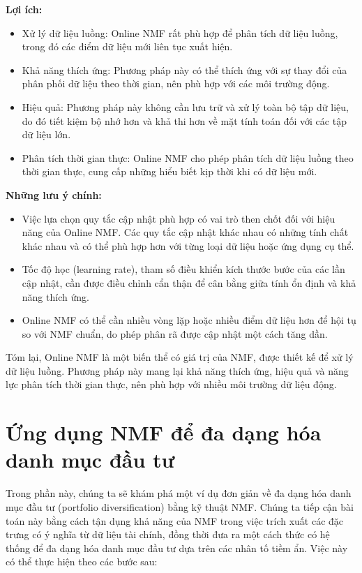 \textbf{Lợi ích:}

\begin{itemize}
\item
  Xử lý dữ liệu luồng: Online NMF rất phù hợp để phân tích dữ liệu luồng, trong đó các điểm dữ liệu mới liên tục xuất hiện.
\item
  Khả năng thích ứng: Phương pháp này có thể thích ứng với sự thay đổi của phân phối dữ liệu theo thời gian, nên phù hợp với các môi trường động.
\item
  Hiệu quả: Phương pháp này không cần lưu trữ và xử lý toàn bộ tập dữ liệu, do đó tiết kiệm bộ nhớ hơn và khả thi hơn về mặt tính toán đối với các tập dữ liệu lớn.
\item
  Phân tích thời gian thực: Online NMF cho phép phân tích dữ liệu luồng theo thời gian thực, cung cấp những hiểu biết kịp thời khi có dữ liệu mới.
\end{itemize}

\textbf{Những lưu ý chính:}

\begin{itemize}
\item
  Việc lựa chọn quy tắc cập nhật phù hợp có vai trò then chốt đối với hiệu năng của Online NMF. Các quy tắc cập nhật khác nhau có những tính chất khác nhau và có thể phù hợp hơn với từng loại dữ liệu hoặc ứng dụng cụ thể.
\item
  Tốc độ học (learning rate), tham số điều khiển kích thước bước của các lần cập nhật, cần được điều chỉnh cẩn thận để cân bằng giữa tính ổn định và khả năng thích ứng.
\item
  Online NMF có thể cần nhiều vòng lặp hoặc nhiều điểm dữ liệu hơn để hội tụ so với NMF chuẩn, do phép phân rã được cập nhật một cách tăng dần.
\end{itemize}

Tóm lại, Online NMF là một biến thể có giá trị của NMF, được thiết kế để xử lý dữ liệu luồng. Phương pháp này mang lại khả năng thích ứng, hiệu quả và năng lực phân tích thời gian thực, nên phù hợp với nhiều môi trường dữ liệu động.

\section{Ứng dụng NMF để đa dạng hóa danh mục đầu tư}

Trong phần này, chúng ta sẽ khám phá một ví dụ đơn giản về đa dạng hóa danh mục đầu tư (portfolio diversification) bằng kỹ thuật NMF. Chúng ta tiếp cận bài toán này bằng cách tận dụng khả năng của NMF trong việc trích xuất các đặc trưng có ý nghĩa từ dữ liệu tài chính, đồng thời đưa ra một cách thức có hệ thống để đa dạng hóa danh mục đầu tư dựa trên các nhân tố tiềm ẩn. Việc này có thể thực hiện theo các bước sau:

